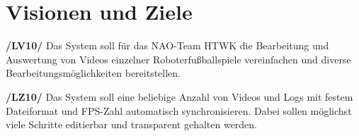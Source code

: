 \chapter{Visionen und Ziele}
\textbf{/LV10/} Das System soll für das NAO-Team HTWK die Bearbeitung und Auswertung von Videos einzelner Roboterfußballspiele vereinfachen und diverse Bearbeitungsmöglichkeiten bereitstellen.

\textbf{/LZ10/} Das System soll eine beliebige Anzahl von Videos und Logs mit festem Dateiformat und FPS-Zahl automatisch synchronisieren. Dabei sollen möglichst viele Schritte editierbar und transparent gehalten werden.

